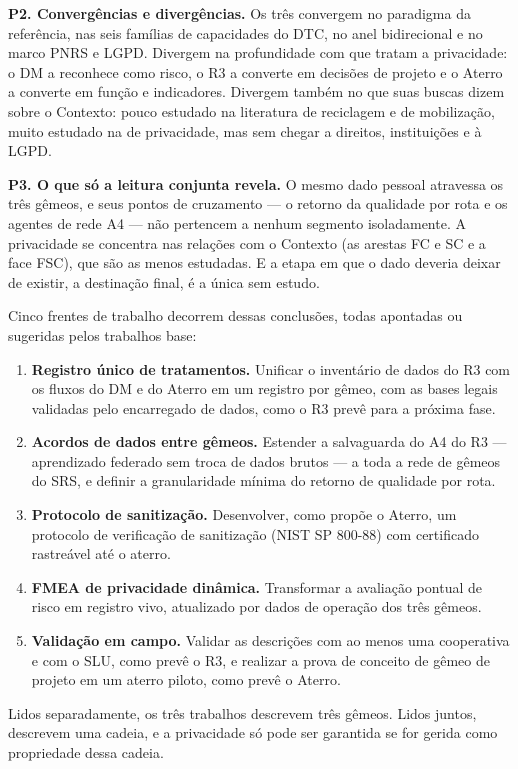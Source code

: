 \documentclass[12pt,a4paper,article,oneside,english,brazil]{abntex2}
\begin{document}
\textbf{P2. Convergências e divergências.} Os três convergem no paradigma da referência, nas seis famílias de capacidades do DTC, no anel bidirecional e no marco PNRS e LGPD. Divergem na profundidade com que tratam a privacidade: o DM a reconhece como risco, o R3 a converte em decisões de projeto e o Aterro a converte em função e indicadores. Divergem também no que suas buscas dizem sobre o Contexto: pouco estudado na literatura de reciclagem e de mobilização, muito estudado na de privacidade, mas sem chegar a direitos, instituições e à LGPD.

\textbf{P3. O que só a leitura conjunta revela.} O mesmo dado pessoal atravessa os três gêmeos, e seus pontos de cruzamento --- o retorno da qualidade por rota e os agentes de rede A4 --- não pertencem a nenhum segmento isoladamente. A privacidade se concentra nas relações com o Contexto (as arestas FC e SC e a face FSC), que são as menos estudadas. E a etapa em que o dado deveria deixar de existir, a destinação final, é a única sem estudo.

Cinco frentes de trabalho decorrem dessas conclusões, todas apontadas ou sugeridas pelos trabalhos base:

\begin{enumerate}
\item \textbf{Registro único de tratamentos.} Unificar o inventário de dados do R3 com os fluxos do DM e do Aterro em um registro por gêmeo, com as bases legais validadas pelo encarregado de dados, como o R3 prevê para a próxima fase.
\item \textbf{Acordos de dados entre gêmeos.} Estender a salvaguarda do A4 do R3 --- aprendizado federado sem troca de dados brutos --- a toda a rede de gêmeos do SRS, e definir a granularidade mínima do retorno de qualidade por rota.
\item \textbf{Protocolo de sanitização.} Desenvolver, como propõe o Aterro, um protocolo de verificação de sanitização (NIST SP 800-88) com certificado rastreável até o aterro.
\item \textbf{FMEA de privacidade dinâmica.} Transformar a avaliação pontual de risco em registro vivo, atualizado por dados de operação dos três gêmeos.
\item \textbf{Validação em campo.} Validar as descrições com ao menos uma cooperativa e com o SLU, como prevê o R3, e realizar a prova de conceito de gêmeo de projeto em um aterro piloto, como prevê o Aterro.
\end{enumerate}

Lidos separadamente, os três trabalhos descrevem três gêmeos. Lidos juntos, descrevem uma cadeia, e a privacidade só pode ser garantida se for gerida como propriedade dessa cadeia.
\end{document}
